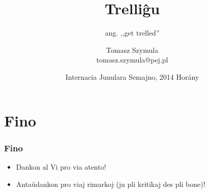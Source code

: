 \documentclass{beamer}
\title{Trelliĝu}
\subtitle{ang. ,,get trelled''}
\author{Tomasz Szymula \\ tomasz.szymula@pej.pl}
\institute[PEJ]{\texttt{[image: bildoj/pej]}}
\date[IJS 2014]{Internacia Junulara Semajno, 2014 Horány}
\begin{document}
  \frame{\titlepage}
 













  

\section*{Fino}
  \begin{frame}
    \frametitle{Fino}

	\begin{itemize}
		\item Dankon al Vi pro via atento!
		
		\item Antaŭdankon pro viaj rimarkoj (ju pli kritikaj des pli bone)! 
		
	\end{itemize}		
	
  \end{frame}
\end{document}
